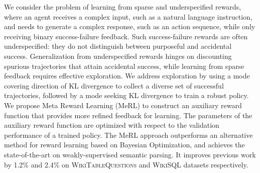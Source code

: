 
We consider the problem of learning from sparse and underspecified
rewards, where an agent receives a complex input, such as a natural
language instruction, and needs to generate a complex response, such
as an action sequence, while only receiving binary success-failure
feedback.  Such success-failure rewards are often underspecified: they
do not distinguish between purposeful and accidental
success. Generalization from underspecified rewards hinges on
discounting spurious trajectories that attain accidental success,
while learning from sparse feedback requires effective exploration.
We address exploration by using a mode covering direction of KL
divergence to collect a diverse set of successful trajectories,
followed by a mode seeking KL divergence to train a robust policy.  We
propose Meta Reward Learning (MeRL) to construct an auxiliary reward
function that provides more refined feedback for learning.  The
parameters of the auxiliary reward function are optimized with respect
to the validation performance of a trained policy. The MeRL approach
outperforms an alternative method for reward learning based on
Bayesian Optimization, and achieves the state-of-the-art on
weakly-supervised semantic parsing. It improves previous work by 1.2\%
and 2.4\% on \textsc{WikiTableQuestions} and \textsc{WikiSQL} datasets
respectively.
